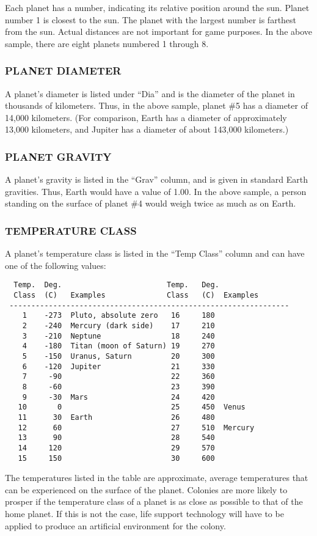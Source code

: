 \documentclass[10pt,titlepage]{article}
\begin{document}
Each planet has a number, indicating its relative position around the sun.
Planet number 1 is closest to the sun.  The planet with the largest number is
farthest from the sun.  Actual distances are not important for game purposes.
In the above sample, there are eight planets numbered 1 through 8.


\subsubsection{PLANET DIAMETER}

A planet's diameter is listed under ``Dia'' and is the diameter of the planet in
thousands of kilometers.  Thus, in the above sample, planet \#5 has a diameter
of 14,000 kilometers.  (For comparison, Earth has a diameter of approximately
13,000 kilometers, and Jupiter has a diameter of about 143,000 kilometers.)


\subsubsection{PLANET GRAVITY}

A planet's gravity is listed in the ``Grav'' column, and is given in standard
Earth gravities.  Thus, Earth would have a value of 1.00.  In the above sample,
a person standing on the surface of planet \#4 would weigh twice as much as on
Earth.


\subsubsection{TEMPERATURE CLASS}

A planet's temperature class is listed in the ``Temp Class'' column and can have
one of the following values:
\begin{verbatim}
  Temp.  Deg.                        Temp.   Deg.
  Class  (C)   Examples              Class   (C)  Examples
 ----------------------------------------------------------------
    1    -273  Pluto, absolute zero   16     180
    2    -240  Mercury (dark side)    17     210
    3    -210  Neptune                18     240
    4    -180  Titan (moon of Saturn) 19     270
    5    -150  Uranus, Saturn         20     300
    6    -120  Jupiter                21     330
    7     -90                         22     360
    8     -60                         23     390
    9     -30  Mars                   24     420
   10       0                         25     450  Venus
   11      30  Earth                  26     480
   12      60                         27     510  Mercury
   13      90                         28     540
   14     120                         29     570
   15     150                         30     600
\end{verbatim}
The temperatures listed in the table are approximate, average temperatures that
can be experienced on the surface of the planet.  Colonies are more likely to
prosper if the temperature class of a planet is as close as possible to that of
the home planet.  If this is not the case, life support technology will have to
be applied to produce an artificial environment for the colony.
\end{document}
